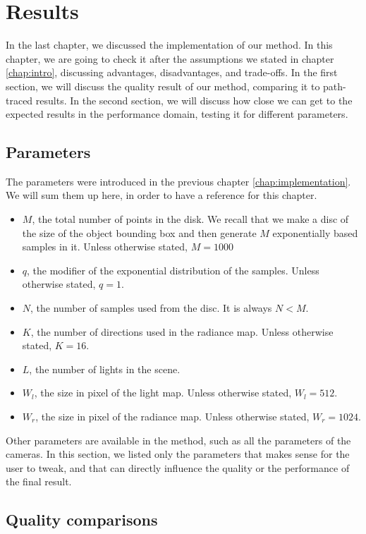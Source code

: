 \chapter{Results}
\label{chap:results}
In the last chapter, we discussed the implementation of our method. In this chapter, we are going to check it after the assumptions we stated in chapter \ref{chap:intro}, discussing advantages, disadvantages, and trade-offs. In the first section, we will discuss the quality result of our method, comparing it to path-traced results. In the second section, we will discuss how close we can get to the expected results in the performance domain, testing it for different parameters. 

\section{Parameters}
\label{sec:parameters}
The parameters were introduced in the previous chapter \ref{chap:implementation}. We will sum them up here, in order to have a reference for this chapter.

\begin{itemize}
\item $M$, the total number of points in the disk. We recall that we make a disc of the size of the object bounding box and then generate $M$ exponentially based samples in it. Unless otherwise stated, $M = 1000$
\item $q$, the modifier of the exponential distribution of the samples. Unless otherwise stated, $q = 1$. 
\item $N$, the number of samples used from the disc. It is always $N < M$.
\item $K$, the number of directions used in the radiance map. Unless otherwise stated, $K = 16$. 
\item $L$, the number of lights in the scene. 
\item $W_l$, the size in pixel of the light map. Unless otherwise stated, $W_l = 512$.
\item $W_r$, the size in pixel of the radiance map. Unless otherwise stated, $W_r = 1024$.
\end{itemize}

Other parameters are available in the method, such as all the parameters of the cameras. In this section, we listed only the parameters that makes sense for the user to tweak, and that can directly influence the quality or the performance of the final result.

\section{Quality comparisons}

